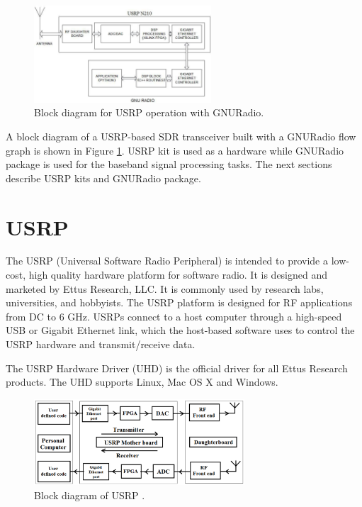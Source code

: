 \begin{figure}
\centering
\includegraphics[width=0.59\textwidth]{usrpGNURadioBlock}
\caption{Block diagram for USRP operation with GNURadio.}
\label{usrpGNURadioBlock}
\end{figure}

A block diagram of a USRP-based SDR transceiver built with a GNURadio flow 
graph is shown in Figure \ref{usrpGNURadioBlock}. USRP kit is used as a
hardware while GNURadio
package is used for the baseband signal processing tasks. The next sections
describe USRP kits and GNURadio package.

\section{USRP}

The USRP (Universal Software Radio Peripheral) is intended to provide a 
low-cost, high quality hardware platform for software radio. It is designed
and marketed by Ettus Research, LLC. It is commonly used by research labs,
universities, and hobbyists. The USRP platform is designed for RF applications
from DC to 6 GHz. USRPs connect to a host computer through a high-speed USB or
Gigabit Ethernet link, which the host-based software uses to control the USRP
hardware and transmit/receive data.

The USRP Hardware Driver (UHD) is the official driver for all Ettus Research
products. The UHD supports Linux, Mac OS X and Windows.

\begin{figure}
\centering
\includegraphics[width=0.7\textwidth]{usrpBlock}
\caption[Block diagram of USRP]{Block diagram of USRP {\cite{kranthi13}}.}
\label{usrpBlock}
\end{figure}


